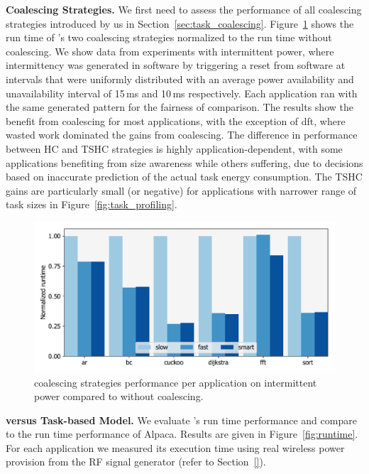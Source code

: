 \textbf{Coalescing Strategies.} We first need to assess the performance of all coalescing strategies introduced by us in Section~\ref{sec:task_coalescing}. Figure~\ref{fig:coalescing} shows the run time of \sys's two coalescing strategies normalized to the run time without coalescing. We show data from experiments with intermittent power, where intermittency was generated in software
by triggering a reset from software at intervals that were uniformly distributed with an average power availability and unavailability interval of 15\,ms and 10\,ms respectively. Each application ran with the same generated pattern for the fairness of comparison. The results show the benefit from coalescing for most applications, with the
exception of dft, where wasted work dominated the gains from coalescing.
The difference in performance between HC and TSHC strategies is highly
application-dependent, with some applications benefiting from size awareness
while others suffering, due to decisions based on inaccurate prediction of the
actual task energy consumption. The TSHC gains are particularly small (or negative) for applications with narrower range of task sizes in Figure~\ref{fig:task_profiling}.

\begin{figure}
	\centering
	\includegraphics[width=\columnwidth]{figures/coalStrategies}
	\caption{\sys coalescing strategies performance per application on intermittent power compared to \sys without coalescing. }
	\label{fig:coalescing}
\end{figure}

\textbf{\sys versus Task-based Model.} We evaluate \sys's run time performance and compare \sys to the run time performance of Alpaca. Results are given in Figure~\ref{fig:runtime}. For each application we measured its execution time using real wireless power provision from the RF signal generator (refer to Section~\ref{}).

